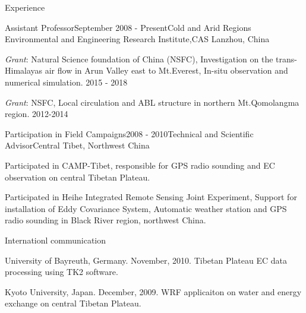 \documentclass{resume} %
\begin{document}
\begin{rSection}{Experience}

\begin{rSubsection}{Assistant Professor}{September 2008 - Present}{Cold and Arid Regions Environmental and Engineering Research Institute,CAS }{Lanzhou, China}
\item {\it Grant}: Natural Science foundation of China (NSFC), Investigation on the trans-Himalayas air flow in Arun Valley east to Mt.Everest, In-situ observation and numerical simulation. 2015 - 2018
\item {\it Grant}: NSFC, Local circulation and ABL structure in northern Mt.Qomolangma region. 2012-2014
\end{rSubsection}
\begin{rSubsection}{Participation in Field Campaigns}{2008 - 2010}{Technical and Scientific Advisor}{Central Tibet, Northwest China}
\item Participated in CAMP-Tibet, responsible for GPS radio sounding and EC observation on central Tibetan Plateau. 
\item Participated in Heihe Integrated Remote Sensing Joint Experiment, Support for installation of Eddy Covariance System, Automatic weather station and GPS radio sounding in Black River region, northwest China.
\end{rSubsection}
\begin{rSubsection}{Internationl communication}{}{}{}
\item University of Bayreuth, Germany. November, 2010. Tibetan Plateau EC data processing using TK2 software. 
\item Kyoto University, Japan. December, 2009. WRF applicaiton on water and energy exchange on central Tibetan Plateau.
\end{rSubsection}
\end{rSection}

\end{document}
